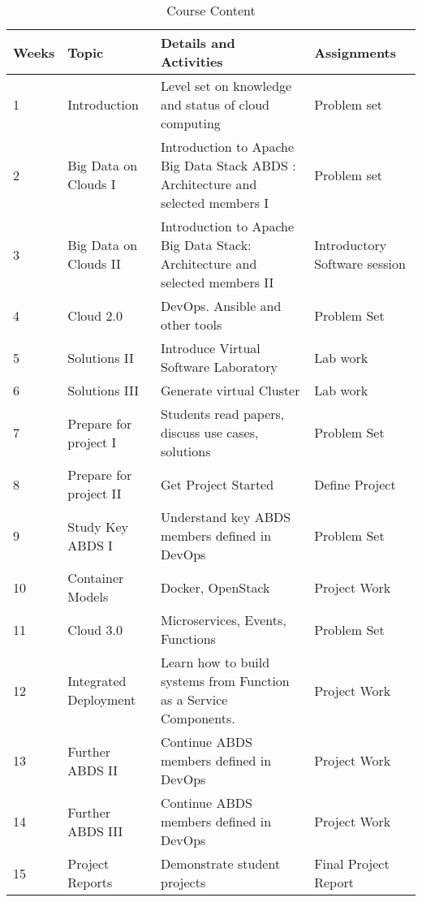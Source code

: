 \begin{table}[h]
\centering
\caption{Course Content}
\label{T:e616}
\begin{tabular}{p{1cm}p{4cm}p{6cm}p{2cm}}
Weeks & Topic                  & Details and Activities                                                           & Assignments                   \\
\hline
1     & Introduction           & Level set on knowledge and status of cloud computing                             & Problem set                   \\
2     & Big Data on Clouds I   & Introduction to Apache Big Data Stack ABDS : Architecture and selected members I & Problem set                   \\
3     & Big Data on Clouds II  & Introduction to Apache Big Data Stack: Architecture and selected members II      & Introductory Software session \\
4     & Cloud 2.0              & DevOps. Ansible and other tools                                                  & Problem Set                   \\
5     & Solutions II           & Introduce Virtual Software Laboratory                                            & Lab work                      \\
6     & Solutions III          & Generate virtual Cluster                                                         & Lab work                      \\
7     & Prepare for project I  & Students read papers, discuss use cases, solutions                               & Problem Set                   \\
8     & Prepare for project II & Get Project Started                                                              & Define Project                \\
9     & Study Key ABDS I       & Understand key ABDS members defined in DevOps                                    & Problem Set                   \\
10    & Container Models       & Docker, OpenStack                                                                & Project Work                  \\
11    & Cloud 3.0              & Microservices, Events, Functions                                                 & Problem Set                   \\
12    & Integrated Deployment  & Learn how to build systems from Function as a Service Components.                & Project Work                  \\
13    & Further ABDS II        & Continue ABDS members defined in DevOps                                          & Project Work                  \\
14    & Further ABDS III       & Continue ABDS members defined in DevOps                                          & Project Work                  \\
15    & Project Reports        & Demonstrate student projects                                                     & Final Project Report         
\end{tabular}
\end{table}